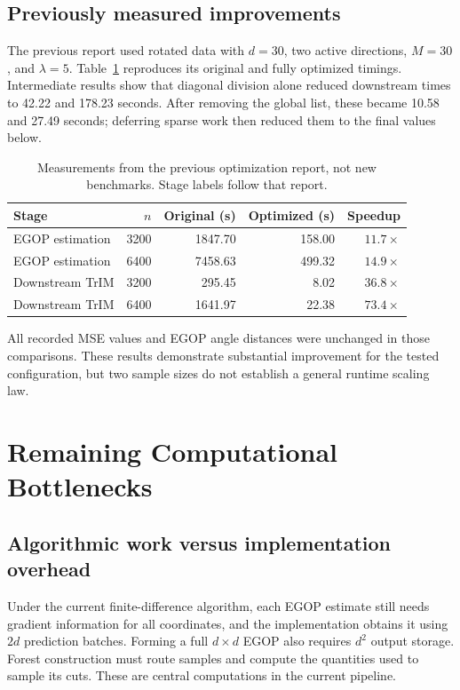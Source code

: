 \documentclass[11pt]{article}
\begin{document}
\subsection{Previously measured improvements}

The previous report used rotated data with $d=30$, two active directions, $M=30$, and $\lambda=5$. Table~\ref{tab:timings} reproduces its original and fully optimized timings. Intermediate results show that diagonal division alone reduced downstream times to 42.22 and 178.23 seconds. After removing the global list, these became 10.58 and 27.49 seconds; deferring sparse work then reduced them to the final values below.

\begin{table}[htbp]
\centering\small
\begin{tabular}{lrrrr}
\toprule
Stage & $n$ & Original (s) & Optimized (s) & Speedup \\
\midrule
EGOP estimation & 3200 & 1847.70 & 158.00 & $11.7\times$ \\
EGOP estimation & 6400 & 7458.63 & 499.32 & $14.9\times$ \\
Downstream TrIM & 3200 & 295.45 & 8.02 & $36.8\times$ \\
Downstream TrIM & 6400 & 1641.97 & 22.38 & $73.4\times$ \\
\bottomrule
\end{tabular}
\caption{Measurements from the previous optimization report, not new benchmarks. Stage labels follow that report.}\label{tab:timings}
\end{table}

All recorded MSE values and EGOP angle distances were unchanged in those comparisons. These results demonstrate substantial improvement for the tested configuration, but two sample sizes do not establish a general runtime scaling law.

\section{Remaining Computational Bottlenecks}

\subsection{Algorithmic work versus implementation overhead}

Under the current finite-difference algorithm, each EGOP estimate still needs gradient information for all coordinates, and the implementation obtains it using $2d$ prediction batches. Forming a full $d\times d$ EGOP also requires $d^2$ output storage. Forest construction must route samples and compute the quantities used to sample its cuts. These are central computations in the current pipeline.
\end{document}
